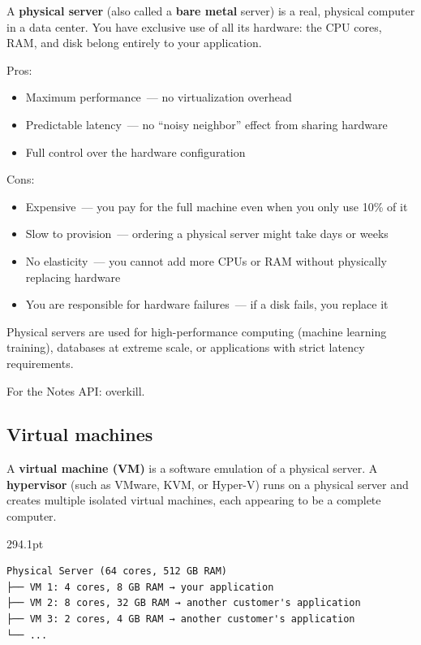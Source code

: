 A \textbf{physical server} (also called a \textbf{bare metal} server) is a real, physical computer in a data center. You have exclusive use of all its hardware: the CPU cores, RAM, and disk belong entirely to your application.

Pros:

\begin{itemize}
\tightlist
\item
  Maximum performance~--- no virtualization overhead
\item
  Predictable latency~--- no ``noisy neighbor'' effect from sharing hardware
\item
  Full control over the hardware configuration
\end{itemize}

\noindent{}Cons:

\begin{itemize}
\tightlist
\item
  Expensive~--- you pay for the full machine even when you only use 10\% of it
\item
  Slow to provision~--- ordering a physical server might take days or weeks
\item
  No elasticity~--- you cannot add more CPUs or RAM without physically replacing hardware
\item
  You are responsible for hardware failures~--- if a disk fails, you replace it
\end{itemize}

\noindent{}Physical servers are used for high-performance computing (machine learning training), databases at extreme scale, or applications with strict latency requirements.

For the Notes API: overkill.

\subsection*{Virtual machines}\label{20-server-fundamentals:virtual-machines}

A \textbf{virtual machine (VM)} is a software emulation of a physical server. A \textbf{hypervisor} (such as VMware, KVM, or Hyper-V) runs on a physical server and creates multiple isolated virtual machines, each appearing to be a complete computer.

\begin{diagrambox}[short]{294.1pt}
\begin{Verbatim}[fontsize=\fontsize{9.0}{8.55}\selectfont]
Physical Server (64 cores, 512 GB RAM)
├── VM 1: 4 cores, 8 GB RAM → your application
├── VM 2: 8 cores, 32 GB RAM → another customer's application
├── VM 3: 2 cores, 4 GB RAM → another customer's application
└── ...
\end{Verbatim}
\end{diagrambox}

